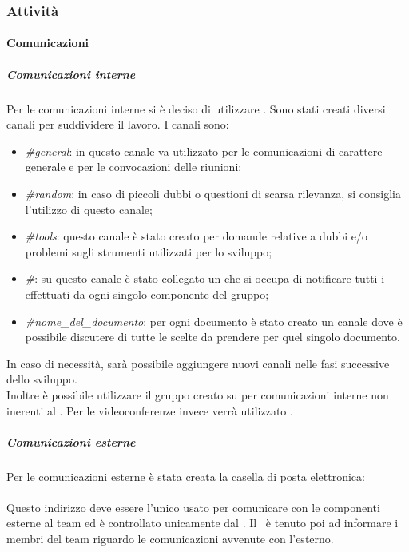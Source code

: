 \subsubsection{Attività}
\label{sec:4.1.1}
	\paragraph{Comunicazioni}
	\label{sec:4.1.1.1}
		\subparagraph{Comunicazioni interne}
		\label{sec:4.1.1.1.1}
			Per le comunicazioni interne si è deciso di utilizzare . Sono stati creati diversi canali per suddividere il lavoro. I canali sono:
			\begin{itemize}
				\item \textit{\#general}: in questo canale va utilizzato per le comunicazioni di carattere generale e per le convocazioni delle riunioni; 
				\item \textit{\#random}: in caso di piccoli dubbi o questioni di scarsa rilevanza, si consiglia l'utilizzo di questo canale; 
				\item \textit{\#tools}: questo canale è stato creato per domande relative a dubbi e/o problemi sugli strumenti utilizzati per lo sviluppo;
				\item \textit{\#}: su questo canale è stato collegato un  che si occupa di notificare tutti i  effettuati da ogni singolo componente del gruppo;
				\item \textit{\#nome\_del\_documento}: per ogni documento è stato creato un canale dove è possibile discutere di tutte le scelte da prendere per quel singolo documento.
			\end{itemize}
			In caso di necessità, sarà possibile aggiungere nuovi canali nelle fasi successive dello sviluppo. \\
			Inoltre è possibile utilizzare il gruppo creato su  per comunicazioni interne non inerenti al . Per le videoconferenze invece verrà utilizzato .
		\subparagraph{Comunicazioni esterne}
		\label{sec:4.1.1.1.2}
			Per le comunicazioni esterne è stata creata la casella di posta elettronica: \\
			\highlight{\EMAIL}\\
			Questo indirizzo deve essere l'unico usato per comunicare con le componenti esterne al team ed è controllato unicamente dal \RES. Il \RES  \ è tenuto poi ad informare i membri del team riguardo le comunicazioni avvenute con l'esterno.
